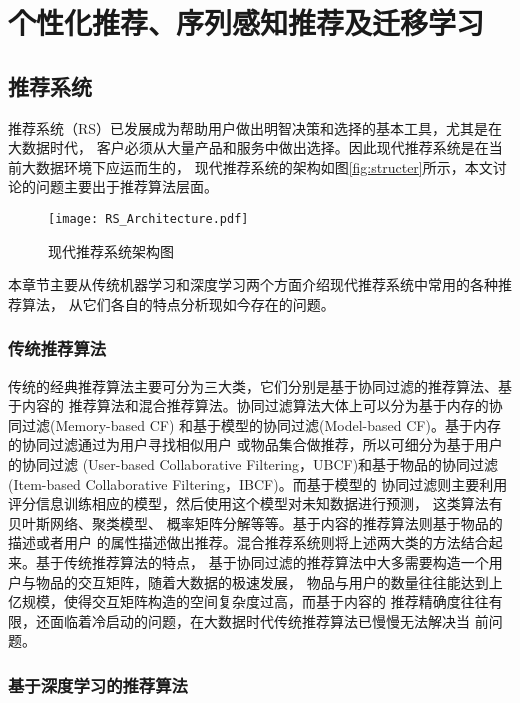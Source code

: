 \chapter{个性化推荐、序列感知推荐及迁移学习}
\section{推荐系统}
推荐系统（RS）已发展成为帮助用户做出明智决策和选择的基本工具，尤其是在大数据时代，%
客户必须从大量产品和服务中做出选择。因此现代推荐系统是在当前大数据环境下应运而生的，%
现代推荐系统的架构如图\ref{fig:structer}所示，本文讨论的问题主要出于推荐算法层面。


\begin{figure}[htb]
  \centering
  \texttt{[image: RS\_Architecture.pdf]}\\
  \caption{现代推荐系统架构图}
  \label{fig:RS_Architecture}
\end{figure}
%
本章节主要从传统机器学习和深度学习两个方面介绍现代推荐系统中常用的各种推荐算法，%
从它们各自的特点分析现如今存在的问题。

\subsection{传统推荐算法}

传统的经典推荐算法主要可分为三大类，它们分别是基于协同过滤的推荐算法、基于内容的%
推荐算法和混合推荐算法。协同过滤算法大体上可以分为基于内存的协同过滤(Memory-based CF)%
和基于模型的协同过滤(Model-based CF)。基于内存的协同过滤通过为用户寻找相似用户%
或物品集合做推荐，所以可细分为基于用户的协同过滤%
(User-based Collaborative Filtering，UBCF)和基于物品的协同过滤%
(Item-based Collaborative Filtering，IBCF)。而基于模型的%
协同过滤则主要利用评分信息训练相应的模型，然后使用这个模型对未知数据进行预测，%
这类算法有贝叶斯网络、聚类模型、%
概率矩阵分解等等。基于内容的推荐算法则基于物品的描述或者用户%
的属性描述做出推荐。混合推荐系统则将上述两大类的方法结合起来。基于传统推荐算法的特点，%
基于协同过滤的推荐算法中大多需要构造一个用户与物品的交互矩阵，随着大数据的极速发展，%
物品与用户的数量往往能达到上亿规模，使得交互矩阵构造的空间复杂度过高，而基于内容的%
推荐精确度往往有限，还面临着冷启动的问题，在大数据时代传统推荐算法已慢慢无法解决当%
前问题。

\subsection{基于深度学习的推荐算法}

